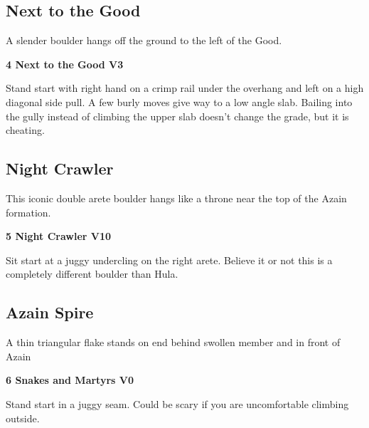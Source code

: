 \begin{multicols}{2}
		\subsection*{Next to the Good}\label{bf:Next to the Good}
		A slender boulder hangs off the ground to the left of the Good.\\
	
			\label{rt:Next to the Good}
\colorbox{green!20}{
\parbox{0.95\linewidth}{
\textbf{
4 Next to the Good V3  \warn
}
}
}

			\begin{adjustwidth}{0.5cm}{}				
			Stand start with right hand on a crimp rail under the overhang and left on a high diagonal side pull. A few burly moves give way to a low angle slab. Bailing into the gully instead of climbing the upper slab doesn't change the grade, but it is cheating.
			\end{adjustwidth}
		\subsection*{Night Crawler}\label{bf:Night Crawler}
		This iconic double arete boulder hangs like a throne near the top of the Azain formation.\\
	

			\label{rt:Night Crawler}
\colorbox{red!20}{
\parbox{0.95\linewidth}{
\textbf{
5 Night Crawler V10  
}
}
}

			\begin{adjustwidth}{0.5cm}{}				
			Sit start at a juggy undercling on the right arete. Believe it or not this is a completely different boulder than Hula.
			\end{adjustwidth}
		\subsection*{Azain Spire}\label{bf:Azain Spire}
		A thin triangular flake stands on end behind swollen member and in front of Azain\\
	

			\label{rt:Snakes and Martyrs}
\colorbox{green!20}{
\parbox{0.95\linewidth}{
\textbf{
6 Snakes and Martyrs V0  
}
}
}

			\begin{adjustwidth}{0.5cm}{}				
			 Stand start in a juggy seam. Could be scary if you are uncomfortable climbing outside.
			\end{adjustwidth}

\end{multicols}

